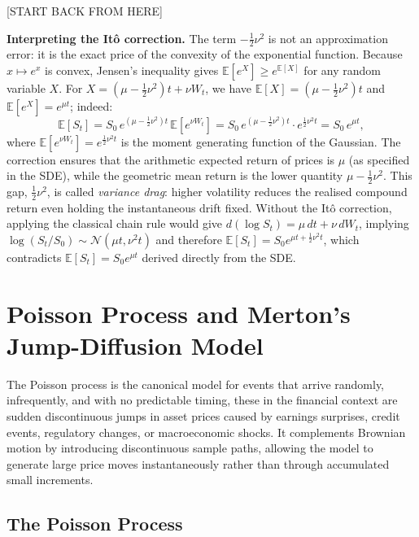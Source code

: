 [START BACK FROM HERE]

\textbf{Interpreting the It\^{o} correction.} The term $-\frac{1}{2}\nu^2$ is
not an approximation error: it is the exact price of the convexity of the
exponential function. Because $x \mapsto e^x$ is convex, Jensen's inequality
gives $\mathbb{E}[e^X] \geq e^{\mathbb{E}[X]}$ for any random variable $X$. For
$X = (\mu - \frac{1}{2}\nu^2)t + \nu W_t$, we have $\mathbb{E}[X] = (\mu -
\frac{1}{2}\nu^2)t$ and $\mathbb{E}[e^X] = e^{\mu t}$; indeed:
\[
    \mathbb{E}[S_t] = S_0\, e^{(\mu - \frac{1}{2}\nu^2)t}\,
    \mathbb{E}\!\left[e^{\nu W_t}\right]
    = S_0\, e^{(\mu - \frac{1}{2}\nu^2)t}\cdot e^{\frac{1}{2}\nu^2 t}
    = S_0\, e^{\mu t},
\]
where $\mathbb{E}[e^{\nu W_t}] = e^{\frac{1}{2}\nu^2 t}$ is the moment
generating function of the Gaussian. The correction ensures that the arithmetic
expected return of prices is $\mu$ (as specified in the SDE), while the
geometric mean return is the lower quantity $\mu - \frac{1}{2}\nu^2$. This
gap, $\frac{1}{2}\nu^2$, is called \textit{variance drag}: higher volatility
reduces the realised compound return even holding the instantaneous drift fixed.
Without the It\^{o} correction, applying the classical chain rule would give
$d(\log S_t) = \mu\, dt + \nu\, dW_t$, implying $\log(S_t/S_0) \sim
\mathcal{N}(\mu t, \nu^2 t)$ and therefore $\mathbb{E}[S_t] = S_0
e^{\mu t + \frac{1}{2}\nu^2 t}$, which contradicts $\mathbb{E}[S_t] = S_0
e^{\mu t}$ derived directly from the SDE.

\section{Poisson Process and Merton's Jump-Diffusion Model}
\label{app:sec:poisson_merton}

The Poisson process is the canonical model for events that arrive randomly,
infrequently, and with no predictable timing, these in the financial context are sudden
discontinuous jumps in asset prices caused by earnings surprises, credit events,
regulatory changes, or macroeconomic shocks. It complements Brownian motion by
introducing discontinuous sample paths, allowing the model to generate
large price moves instantaneously rather than through accumulated small
increments.

\subsection{The Poisson Process}

